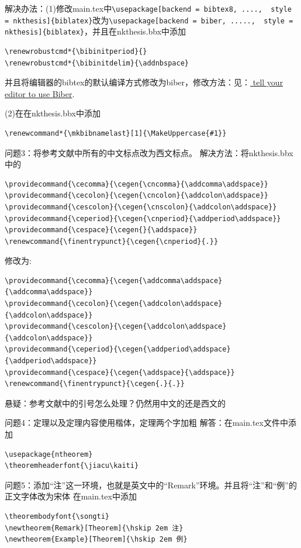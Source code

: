 解决办法：(1)修改main.tex中\verb|\usepackage[backend = bibtex8, ....,  style = nkthesis]{biblatex}|改为\verb|\usepackage[backend = biber, .....,  style = nkthesis]{biblatex}|，并且在nkthesis.bbx中添加
\begin{verbatim}
\renewrobustcmd*{\bibinitperiod}{}
\renewrobustcmd*{\bibinitdelim}{\addnbspace}
\end{verbatim}
并且将编辑器的bibtex的默认编译方式修改为biber，修改方法：见：\href{http://tex.stackexchange.com/questions/154751/biblatex-with-biber-configuring-my-editor-to-avoid-undefined-citations}{ tell your editor to use Biber}.

(2)在在nkthesis.bbx中添加
\begin{verbatim}
\renewcommand*{\mkbibnamelast}[1]{\MakeUppercase{#1}}
\end{verbatim}

问题3：将参考文献中所有的中文标点改为西文标点。
解决方法：将nkthesis.bbx中的
\begin{verbatim}
\providecommand{\cecomma}{\cegen{\cncomma}{\addcomma\addspace}}
\providecommand{\cecolon}{\cegen{\cncolon}{\addcolon\addspace}}
\providecommand{\cescolon}{\cegen{\cnscolon}{\addcolon\addspace}}
\providecommand{\ceperiod}{\cegen{\cnperiod}{\addperiod\addspace}}
\providecommand{\cespace}{\cegen{}{\addspace}}
\renewcommand{\finentrypunct}{\cegen{\cnperiod}{.}}
\end{verbatim}
修改为:
\begin{verbatim}
\providecommand{\cecomma}{\cegen{\addcomma\addspace}{\addcomma\addspace}}
\providecommand{\cecolon}{\cegen{\addcolon\addspace}{\addcolon\addspace}}
\providecommand{\cescolon}{\cegen{\addcolon\addspace}{\addcolon\addspace}}
\providecommand{\ceperiod}{\cegen{\addperiod\addspace}{\addperiod\addspace}}
\providecommand{\cespace}{\cegen{\addspace}{\addspace}}
\renewcommand{\finentrypunct}{\cegen{.}{.}}
\end{verbatim}
悬疑：参考文献中的引号怎么处理？仍然用中文的还是西文的

问题4：定理以及定理内容使用楷体，定理两个字加粗
解答：在main.tex文件中添加
\begin{verbatim}
\usepackage{ntheorem}
\theoremheaderfont{\jiacu\kaiti}
\end{verbatim}

问题5：添加“注”这一环境，也就是英文中的“Remark”环境。并且将“注”和“例”的正文字体改为宋体
在main.tex中添加
\begin{verbatim}
\theorembodyfont{\songti}
\newtheorem{Remark}[Theorem]{\hskip 2em 注}
\newtheorem{Example}[Theorem]{\hskip 2em 例}
\end{verbatim}

